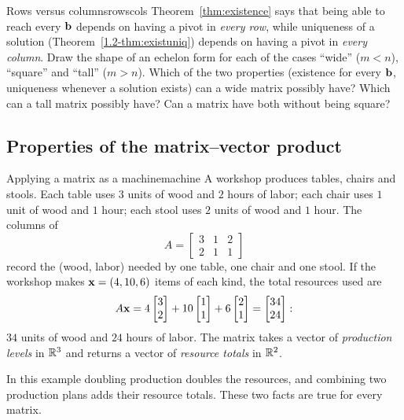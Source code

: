 \documentclass[11pt]{article}
\begin{document}
\begin{think}{Rows versus columns}{rowscols}
Theorem~\ref{thm:existence} says that being able to reach every $\mathbf{b}$ depends on having a pivot in \emph{every row}, while uniqueness of a
solution (Theorem~\ref{1.2-thm:existuniq}) depends on having a pivot in \emph{every column}. Draw the shape of an echelon form for each of the cases
``wide'' ($m<n$), ``square'' and ``tall'' ($m>n$). Which of the two properties (existence for every $\mathbf{b}$, uniqueness whenever a solution exists)
can a wide matrix possibly have? Which can a tall matrix possibly have? Can a matrix have both without being square?
\end{think}
 
\subsection*{Properties of the matrix--vector product}
 
\begin{exmp}{Applying a matrix as a machine}{machine}
A workshop produces tables, chairs and stools. Each table uses $3$ units of wood and $2$ hours of labor; each chair uses $1$ unit of wood and $1$ hour; each stool uses
$2$ units of wood and $1$ hour. The columns of
\[
A=\begin{bmatrix}3&1&2\\2&1&1\end{bmatrix}
\]
record the (wood, labor) needed by one table, one chair and one stool. If the workshop makes $\mathbf{x}=(4,10,6)$ items of each kind, the total resources used are
\[
A\mathbf{x}=4\begin{bmatrix}3\\2\end{bmatrix}+10\begin{bmatrix}1\\1\end{bmatrix}+6\begin{bmatrix}2\\1\end{bmatrix}=\begin{bmatrix}34\\24\end{bmatrix}:
\]
$34$ units of wood and $24$ hours of labor. The matrix takes a vector of \emph{production levels} in $\mathbb{R}^3$ and returns a vector of \emph{resource totals} in $\mathbb{R}^2$.
\end{exmp}
 
In this example doubling production doubles the resources, and combining two production plans adds their resource totals. These two facts are true for every matrix.
 
\end{document}
